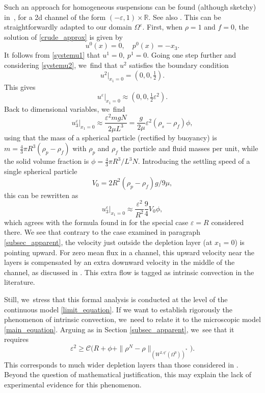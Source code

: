 \documentclass[JEP,XML,SOM,Unicode,NoEqCountersInSection,published]{cedram}
\theoremstyle{plain}
\theoremstyle{definition}
\let\eps\varepsilon
\newcommand{\R}{\mathbb{R}}
\begin{document}
Such an approach for homogeneous suspensions can be found (although sketchy) in~\cite{BFAH96}, for a 2d channel of the form $(-\eps,1) \times \R$. See also \cite{BFBA98}. This can be straightforwardly adapted to our domain $\Omega^\eps$. First, when $\rho=1$ and $f=0$, the solution of \eqref{crude_approx} is given by
\[
u^0(x) = 0, \quad p^0(x) = -x_3.
\]
It follows from \eqref{systemu1} that $u^1=0, \: p^1 = 0$.
Going one step further and considering \eqref{systemu2}, we~find that $u^2$ satisfies the boundary condition
\[
u^2\vert_{x_1=0}= (0,0,\tfrac{1}{2}).
\]
This gives
\[
u^\eps\vert_{x_1=0} \approx (0,0, \tfrac{1}{2} \eps^2).
\]
Back to dimensional variables, we~find
\[
u^\eps_3\vert_{x_1=0} \approx \frac{\eps^2 mgN}{2 \mu L^3} = \frac{g}{2\mu} \eps^2 (\rho_s-\rho_f) \phi,
\]
using that the mass of a spherical particle (rectified by buoyancy) is \hbox{$m \!=\! \frac{4}{3} \pi R^3 (\rho_p \!-\! \rho_f)$} with $\rho_p$ and $\rho_f$ the particle and fluid masses per unit, while the solid volume fraction is $\phi = \frac{4}{3}\pi R^3/L^3 N$. Introducing the settling speed of a single spherical particle
\[
V_0 = 2R^2 (\rho_p - \rho_f)g/9\mu,
\]
this can be rewritten as
\[
u^\eps_3\vert_{x_1=0} \approx \frac{\eps^2}{R^2} \frac{9}{4} V_0 \phi,
\]
which agrees with the formula found in \cite{BFAH96} for the special case $\eps = R$ considered there.
We see that contrary to the case examined in paragraph \ref{subsec_apparent}, the velocity just outside the depletion layer (at $x_1=0$) is pointing upward. For zero mean flux in a channel, this upward velocity near the layers is compensated by an extra downward velocity in the middle of the channel, as discussed in \cite{BFAH96}. This extra flow is tagged as intrinsic convection in the literature.

Still, we~stress that this formal analysis is conducted at the level of the continuous model \eqref{limit_equation}. If we want to establish rigorously the phenomenon of intrinsic convection, we~need to relate it to the microscopic model \eqref{main_equation}. Arguing as in Section \ref{subsec_apparent}, we~see that it requires
\[
\eps^2 \ge \mathcal{C} \big(R+ \phi + \|\rho^N-\rho\|_{(W^{2,q'}(\Omega^0))^*} \big).
\]
This corresponds to much wider depletion layers than those considered in \cite{BFAH96}. Beyond the question of mathematical justification, this may explain the lack of experimental evidence for this phenomenon.

\appendix
\end{document}
